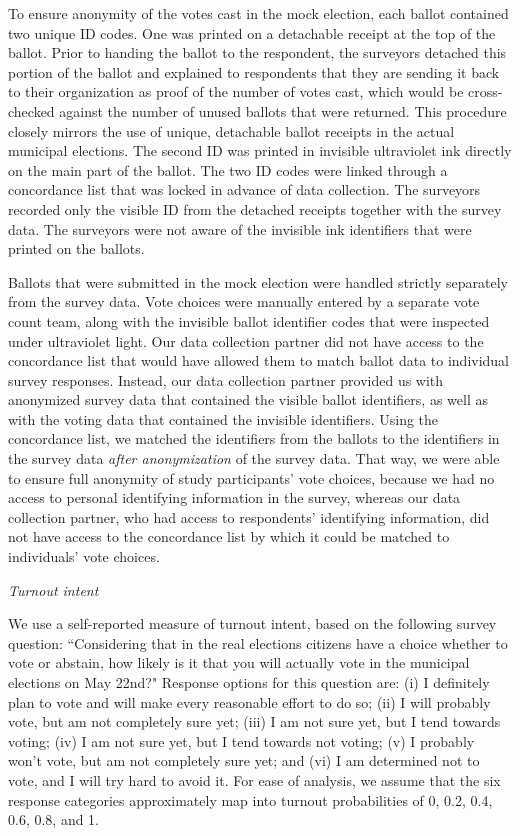 \documentclass[11pt]{article}
\begin{document}
To ensure anonymity of the votes cast in the mock election, each ballot contained two unique ID codes. One was printed on a detachable receipt at the top of the ballot. Prior to handing the ballot to the respondent, the surveyors detached this portion of the ballot and explained to respondents that they are sending it back to their organization as proof of the number of votes cast, which would be cross-checked against the number of unused ballots that were returned. This procedure closely mirrors the use of unique, detachable ballot receipts in the actual municipal elections. The second ID was printed in invisible ultraviolet ink directly on the main part of the ballot. The two ID codes were linked through a concordance list that was locked in advance of data collection. The surveyors recorded only the visible ID from the detached receipts together with the survey data. The surveyors were not aware of the invisible ink identifiers that were printed on the ballots. 

Ballots that were submitted in the mock election were handled strictly separately from the survey data. Vote choices were manually entered by a separate vote count team, along with the invisible ballot identifier codes that were inspected under ultraviolet light. Our data collection partner did not have access to the concordance list that would have allowed them to match ballot data to individual survey responses. Instead, our data collection partner provided us with anonymized survey data that contained the visible ballot identifiers, as well as with the voting data that contained the invisible identifiers. Using the concordance list, we matched the identifiers from the ballots to the identifiers in the survey data \emph{after anonymization} of the survey data. That way, we were able to ensure full anonymity of study participants' vote choices, because we had no access to personal identifying information in the survey, whereas our data collection partner, who had access to respondents' identifying information, did not have access to the concordance list by which it could be matched to individuals' vote choices.

\emph{Turnout intent}

We use a self-reported measure of turnout intent, based on the following survey question: ``Considering that in the real elections citizens have a choice whether to vote or abstain, how likely is it that you will actually vote in the municipal elections on May 22nd?" Response options for this question are: (i) I definitely plan to vote and will make every reasonable effort to do so; (ii) I will probably vote, but am not completely sure yet; (iii) I am not sure yet, but I tend towards voting; (iv) I am not sure yet, but I tend towards not voting; (v) I probably won't vote, but am not completely sure yet; and (vi) I am determined not to vote, and I will try hard to avoid it. For ease of analysis, we assume that the six response categories approximately map into turnout probabilities of 0, 0.2, 0.4, 0.6, 0.8, and 1.
\end{document}
